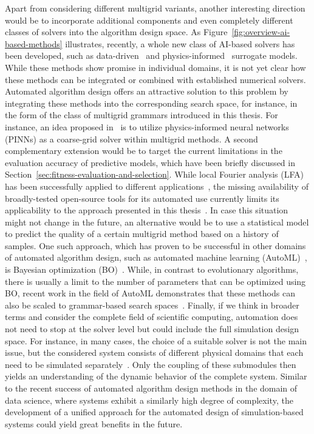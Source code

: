 Apart from considering different multigrid variants, another interesting direction would be to incorporate additional components and even completely different classes of solvers into the algorithm design space.
As Figure~\ref{fig:overview-ai-based-methods} illustrates, recently, a whole new class of AI-based solvers has been developed, such as data-driven~\cite{thuerey2020deep} and physics-informed~\cite{karniadakis2021physics} surrogate models.
While these methods show promise in individual domains, it is not yet clear how these methods can be integrated or combined with established numerical solvers.
Automated algorithm design offers an attractive solution to this problem by integrating these methods into the corresponding search space, for instance, in the form of the class of multigrid grammars introduced in this thesis.
For instance, an idea proposed in~\cite{markidis2021old} is to utilize physics-informed neural networks (PINNs) as a coarse-grid solver within multigrid methods.
A second complementary extension would be to target the current limitations in the evaluation accuracy of predictive models, which have been briefly discussed in Section~\ref{sec:fitness-evaluation-and-selection}.
While local Fourier analysis (LFA) has been successfully applied to different applications~\cite{rodrigo2017validity}, the missing availability of broadly-tested open-source tools for its automated use currently limits its applicability to the approach presented in this thesis~\cite{schmitt2020constructing}.
In case this situation might not change in the future, an alternative would be to use a statistical model to predict the quality of a certain multigrid method based on a history of samples.
One such approach, which has proven to be successful in other domains of automated algorithm design, such as automated machine learning (AutoML)~\cite{kotthoff2019auto,snoek2012practical}, is Bayesian optimization (BO)~\cite{frazier2018tutorial}.
While, in contrast to evolutionary algorithms, there is usually a limit to the number of parameters that can be optimized using BO, recent work in the field of AutoML demonstrates that these methods can also be scaled to grammar-based search spaces~\cite{schrodi2022towards}.
Finally, if we think in broader terms and consider the complete field of scientific computing, automation does not need to stop at the solver level but could include the full simulation design space.
For instance, in many cases, the choice of a suitable solver is not the main issue, but the considered system consists of different physical domains that each need to be simulated separately~\cite{gomes2018co}.
Only the coupling of these submodules then yields an understanding of the dynamic behavior of the complete system.
Similar to the recent success of automated algorithm design methods in the domain of data science, where systems exhibit a similarly high degree of complexity, the development of a unified approach for the automated design of simulation-based systems could yield great benefits in the future.